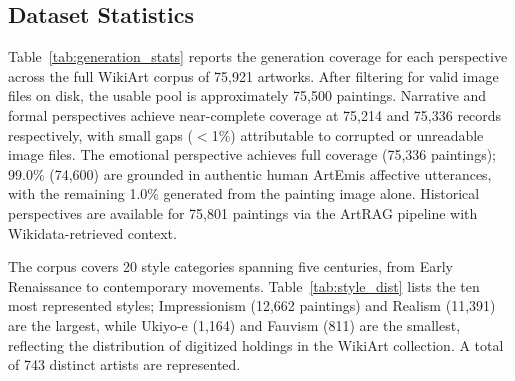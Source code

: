 

\subsection{Dataset Statistics}

Table~\ref{tab:generation_stats} reports the generation coverage for each perspective across the full WikiArt corpus of 75,921 artworks.
After filtering for valid image files on disk, the usable pool is approximately 75,500 paintings.
Narrative and formal perspectives achieve near-complete coverage at 75,214 and 75,336 records respectively, with small gaps ($<$1\%) attributable to corrupted or unreadable image files.
The emotional perspective achieves full coverage (75,336 paintings); 99.0\% (74,600) are grounded in authentic human ArtEmis affective utterances, with the remaining 1.0\% generated from the painting image alone.
Historical perspectives are available for 75,801 paintings via the ArtRAG pipeline with Wikidata-retrieved context.


The corpus covers 20 style categories spanning five centuries, from Early Renaissance to contemporary movements.
Table~\ref{tab:style_dist} lists the ten most represented styles; Impressionism (12,662 paintings) and Realism (11,391) are the largest, while Ukiyo-e (1,164) and Fauvism (811) are the smallest, reflecting the distribution of digitized holdings in the WikiArt collection.
A total of 743 distinct artists are represented.

